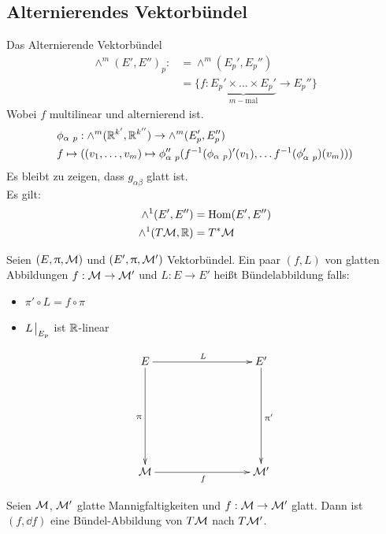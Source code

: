\subsection{Alternierendes Vektorbündel}
Das Alternierende Vektorbündel
\begin{align}
\wedge^m (E', E'')_p :&= \wedge^m (E_{p}', E_{p}'')\\
&= \{ f: \underbrace{E_{p}' \times \dots \times E_{p}'}_{m-\mathrm{mal}} \to E_{p}'' \}
\end{align}
Wobei $f$ multilinear und alternierend ist. 
\begin{align}
&\phi_{\alpha \ p}: \wedge^m (\mathbb{R}^{k'}, \mathbb{R}^{k''}) \to \wedge^m (E_{p}', E_{p} '') \\
&f \mapsto ((v_1, \dots, v_m) \mapsto \phi_{\alpha \ p} '' (f^{-1}(\phi_{\alpha \ p}) ' (v_1), \dots f^{-1}(\phi_{\alpha \ p}') (v_m)))
\end{align}
Es bleibt zu zeigen, dass $g_{\alpha \beta}$ glatt ist.\\
Es gilt: 
\begin{align}
\wedge^1 (E', E'') &= \mathrm{Hom}(E', E'')\\
\wedge^1 (T\mathcal{M}, \mathbb{R}) &= T^{*}\mathcal{M}
\end{align}

\begin{defs}
Seien $(E, \uppi, \mathcal{M})$ und $(E', \uppi, \mathcal{M}')$ Vektorbündel.
Ein paar $(f, L)$ von glatten Abbildungen $f: \mathcal{M} \to \mathcal{M}'$ und $L: E \to E'$ heißt Bündelabbildung falls:
\begin{itemize}
\item $\pi' \circ L = f \circ \pi$
\item $L\eval_{E_p}$ ist $\mathbb{R}$-linear
\end{itemize}


\begin{align}
\begin{xy}
  \xymatrix@=0.25\linewidth{
      E \ar[r]^L \ar[d]_\pi    &   E' \ar[d]^{\pi '}  \\
      \mfk \ar[r]_f             &   \mfk'   
  }
\end{xy}
\end{align}
\end{defs}

\begin{bsp}
Seien $\mathcal{M}$, $\mathcal{M}'$ glatte Mannigfaltigkeiten und $f:\mathcal{M} \to \mathcal{M}'$ glatt.
Dann ist $(f, \dd f)$ eine Bündel-Abbildung von $T\mathcal{M}$ nach $T\mathcal{M}'$.
\end{bsp}

